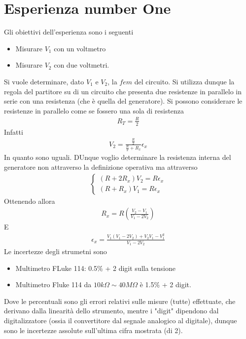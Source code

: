 \documentclass[a4paper, oneside]{article}
\begin{document}
\section{Esperienza number One}
Gli obiettivi dell'esperienza sono i seguenti
\begin{itemize}
    \item Misurare $V_1$ con un voltmetro
    \item Misurare $V_2$ con due voltmetri.
\end{itemize}
Si vuole determinare, dato $V_1$ e $V_2$, 
la $fem$ del circuito. Si utilizza dunque la regola 
del partitore su di un circuito che presenta due resistenze in parallelo 
in serie con una resistenza (che è quella del generatore). Si possono considerare
le resistenze in parallelo come se fossero una sola di 
resistenza
\begin{gather*}
    R_T = \frac{R}{2}
\end{gather*}
Infatti
\begin{gather*}
    V_2 = \frac{\frac{R}{2}}{\frac{R}{2} + R_x} \epsilon_x
\end{gather*}
In quanto sono uguali. DUnque voglio determinare la resistenza interna del generatore 
non attraverso la definizione operativa ma attraverso 
\begin{gather*}
    \left\{\begin{array}{l}
        (R + 2R_x) V_2 = R \epsilon_x \\
        (R + R_x)V_1 = R\epsilon_x
    \end{array}\right.
\end{gather*}
Ottenendo allora 
\begin{gather*}
    R_x = R\left(\frac{V_2 - V_1}{V_1 - 2V_2}\right)
\end{gather*}
E
\begin{gather*}
    \epsilon_x = \frac{V_1(V_1 - 2V_2) + V_2V_1 - V_1^{2}}{V_1 - 2V_2}
\end{gather*}
Le incertezze degli strumetni sono
\begin{itemize}
    \item Multimetro FLuke 114: 0.5\% + 2 digit sulla tensione
    \item Multimetro Fluke 114 da $10k\Omega \sim 40 M\Omega$ è 1.5\% + 2 digit. 
\end{itemize}
Dove le percentuali sono gli errori relativi sulle misure (tutte) effettuate, 
che derivano dalla linearità dello strumento, mentre i "digit" dipendono 
dal digitalizzatore (ossia il convertitore dal segnale analogico al digitale), 
dunque sono le incertezze assolute sull'ultima cifra mostrata (di 2). 
\end{document}
